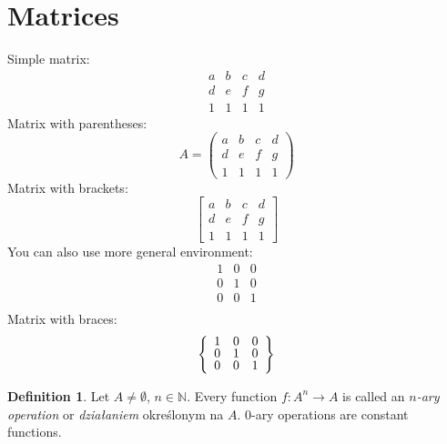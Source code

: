 \documentclass[a4paper,11pt,twoside]{report}
\theoremstyle{definition}
\newtheorem{definition}[theorem]{Definition}
\begin{document}
\section{Matrices}

Simple matrix:
\begin{equation*}
	\begin{matrix}
	a & b & c & d \\
	d & e & f & g \\
	1 & 1 & 1 & 1
	\end{matrix}
\end{equation*}
%
Matrix with parentheses:
%
\begin{equation*}
	A = 
	\begin{pmatrix}
	a & b & c & d \\
	d & e & f & g \\
	1 & 1 & 1 & 1
	\end{pmatrix}
\end{equation*}
%
Matrix with brackets:
%
\begin{equation*}
	\begin{bmatrix}
	a & b & c & d \\
	d & e & f & g \\
	1 & 1 & 1 & 1
	\end{bmatrix}
\end{equation*}
%
You can also use more general environment:
%
\begin{equation*}
	\renewcommand{\arraystretch}{0.8}
	\begin{array}{ccc}
	1 & 0 & 0 \\
	0 & 1 & 0 \\
	0 & 0 & 1 \\
	\end{array}
\end{equation*}
%
Matrix with braces:
%
\begin{equation*}
	\left\{
	\renewcommand{\arraystretch}{0.8}
	\begin{array}{ccc}
	1 & 0 & 0 \\
	0 & 1 & 0 \\
	0 & 0 & 1 \\
	\end{array}\right\}
\end{equation*}

\begin{definition}
	Let $A\neq \emptyset$, $n \in \mathbb{N}$. Every function $f\colon A^n \to A$ is called an \emph{$n$-ary operation} or \emph{działaniem} określonym na $A$.
	$0$-ary operations are constant functions.
\end{definition}
\end{document}

